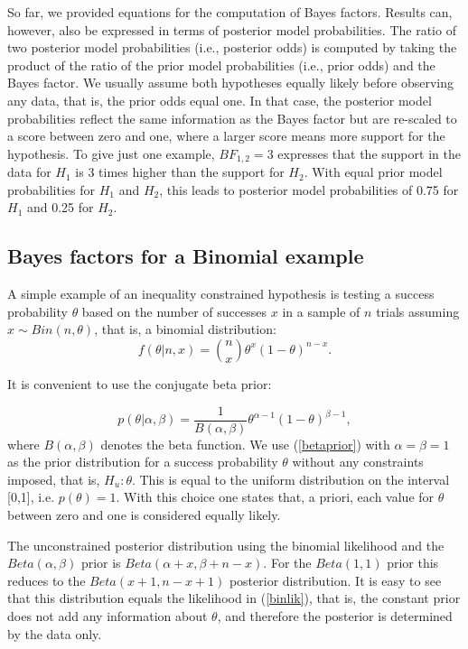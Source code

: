 \documentclass[11pt,reqno]{article}
\begin{document}
So far, we provided equations for the computation of Bayes factors. Results can, however, also be expressed in terms of posterior model probabilities. The ratio of two posterior model probabilities (i.e., posterior odds) is computed by taking the product of the ratio of the prior model probabilities (i.e., prior odds) and the Bayes factor. We usually assume both hypotheses equally likely before observing any data, that is, the prior odds equal one. In that case, the posterior model probabilities reflect the same information as the Bayes factor but are re-scaled to a score between zero and one, where a larger score means more support for the hypothesis. To give just one example, $BF_{1,2}=3$ expresses that the support in the data for $H_1$ is 3 times higher than the support for $H_2$. With equal prior model probabilities for $H_1$ and $H_2$, this leads to posterior model probabilities of 0.75 for $H_1$ and 0.25 for $H_2$.



\subsection{Bayes factors for a Binomial example}\label{Singlestudy}


A simple example of an inequality constrained hypothesis is testing a success probability $\theta$ based on the number of successes $x$ in a sample of $n$ trials assuming $x \sim Bin(n, \theta)$, that is, a binomial distribution:
\begin{equation}\label{binlik}
  f(\theta|n, x) = \binom{n}{x}\theta^x(1-\theta)^{n-x}.
\end{equation}

\noindent It is convenient to use the conjugate beta prior:

\begin{equation}\label{betaprior}
  p(\theta|\alpha, \beta) = \frac{1}{B(\alpha, \beta)} \theta^{\alpha-1}(1-\theta)^{\beta-1},
\end{equation}
where $B(\alpha, \beta)$ denotes the beta function.
We use (\ref{betaprior}) with $\alpha=\beta=1$ as the prior distribution for a success probability $\theta$ without any constraints imposed, that is,  $H_u: \theta$. This is equal to the uniform distribution on the interval [0,1], i.e. $p(\theta) = 1$. With this choice one states that, a priori, each value for $\theta$ between zero and one is considered equally likely.

The unconstrained posterior distribution using the binomial likelihood and the $Beta(\alpha,\beta)$ prior is $Beta(\alpha+x, \beta+n-x)$. For the $Beta(1,1)$ prior this reduces to the $Beta(x+1, n-x+1)$ posterior distribution. It is easy to see that this distribution equals the likelihood in (\ref{binlik}), that is, the constant prior does not add any information about $\theta$, and therefore the posterior is determined by the data only.
\end{document}

